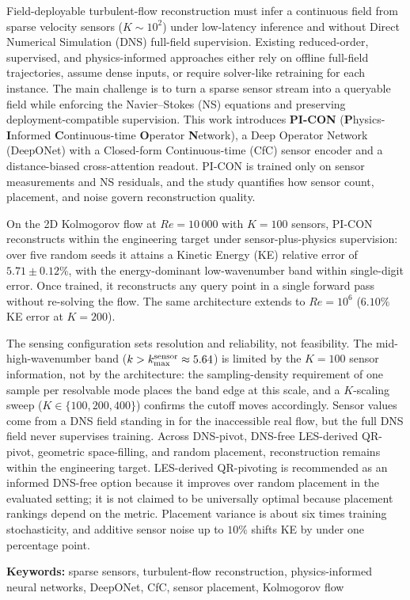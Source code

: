 
Field-deployable turbulent-flow reconstruction must infer a continuous field from sparse velocity sensors ($K \sim 10^2$) under low-latency inference and without Direct Numerical Simulation (DNS) full-field supervision. Existing reduced-order, supervised, and physics-informed approaches either rely on offline full-field trajectories, assume dense inputs, or require solver-like retraining for each instance. The main challenge is to turn a sparse sensor stream into a queryable field while enforcing the Navier--Stokes (NS) equations and preserving deployment-compatible supervision. This work introduces \textbf{PI-CON} (\textbf{P}hysics-\textbf{I}nformed \textbf{C}ontinuous-time \textbf{O}perator \textbf{N}etwork), a Deep Operator Network (DeepONet) with a Closed-form Continuous-time (CfC) sensor encoder and a distance-biased cross-attention readout. PI-CON is trained only on sensor measurements and NS residuals, and the study quantifies how sensor count, placement, and noise govern reconstruction quality.

On the 2D Kolmogorov flow at $Re=10\,000$ with $K=100$ sensors, PI-CON reconstructs within the engineering target under sensor-plus-physics supervision: over five random seeds it attains a Kinetic Energy (KE) relative error of $\mathbf{5.71 \pm 0.12\%}$, with the energy-dominant low-wavenumber band within single-digit error. Once trained, it reconstructs any query point in a single forward pass without re-solving the flow. The same architecture extends to $Re=10^6$ ($6.10\%$ KE error at $K=200$).

The sensing configuration sets resolution and reliability, not feasibility. The mid-high-wavenumber band ($k > k_{\max}^{\rm sensor}\approx 5.64$) is limited by the $K=100$ sensor information, not by the architecture: the sampling-density requirement of one sample per resolvable mode places the band edge at this scale, and a $K$-scaling sweep ($K \in \{100, 200, 400\}$) confirms the cutoff moves accordingly. Sensor values come from a DNS field standing in for the inaccessible real flow, but the full DNS field never supervises training. Across DNS-pivot, DNS-free LES-derived QR-pivot, geometric space-filling, and random placement, reconstruction remains within the engineering target. LES-derived QR-pivoting is recommended as an informed DNS-free option because it improves over random placement in the evaluated setting; it is not claimed to be universally optimal because placement rankings depend on the metric. Placement variance is about six times training stochasticity, and additive sensor noise up to $10\%$ shifts KE by under one percentage point.

\smallskip

\noindent\textbf{Keywords:} sparse sensors, turbulent-flow reconstruction, physics-informed neural networks, DeepONet, CfC, sensor placement, Kolmogorov flow
